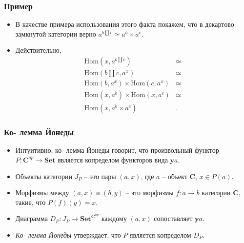 \documentclass{beamer}
\theoremstyle{definition}
\newcommand{\cat}[1]{\mathbf{#1}}
\renewcommand{\C}{\cat{C}}
\newcommand{\y}{\cat{y}}
\newcommand{\Set}{\cat{Set}}
\newcommand{\Hom}{\mathrm{Hom}}
\begin{document}
\begin{frame}
\frametitle{Пример}
\begin{itemize}
\item В качестве примера использования этого факта покажем, что в декартово замкнутой категории верно $a^{b \amalg c} \simeq a^b \times a^c$.
\item Действительно,
\begin{align*}
\Hom(x,a^{b \amalg c}) & \simeq \\
\Hom(b \amalg c,a^x) & \simeq \\
\Hom(b,a^x) \times \Hom(c,a^x) & \simeq \\
\Hom(x,a^b) \times \Hom(x,a^c) & \simeq \\
\Hom(x,a^b \times a^c) & .
\end{align*}
\end{itemize}
\end{frame}

\begin{frame}
\frametitle{Ко- лемма Йонеды}
\begin{itemize}
\item Интуитивно, ко- лемма Йонеды говорит, что произвольный функтор $P : \C^{op} \to \Set$ является копределом функторов вида $\y a$.
\item Объекты категории $J_P$ -- это пары $(a,x)$, где $a$ -- объект $\C$, $x \in P(a)$.
\item Морфизмы между $(a,x)$ и $(b,y)$ -- это морфизмы $f : a \to b$ категории $\C$, такие, что $P(f)(y) = x$.
\item Диаграмма $D_P : J_P \to \Set^{\C^{op}}$ каждому $(a,x)$ сопоставляет $\y a$.
\item \emph{Ко- лемма Йонеды} утверждает, что $P$ является копределом $D_P$.
\end{itemize}
\end{frame}
\end{document}
